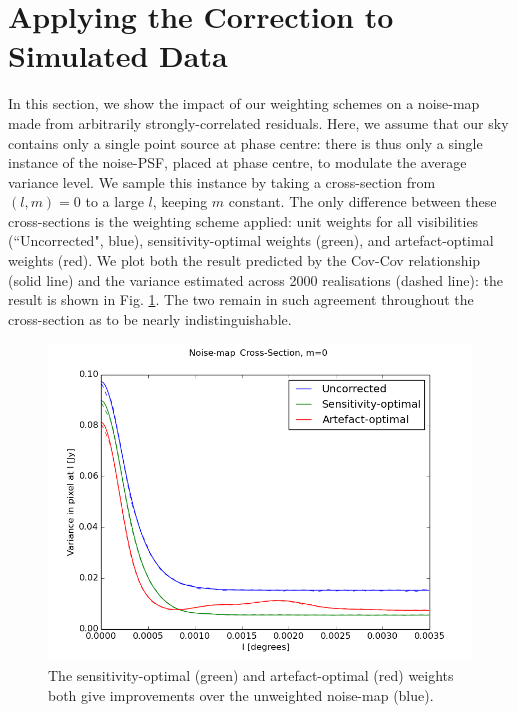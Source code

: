 \section{Applying the Correction to Simulated Data}\label{section.simulations.application}


\pg
In this section, we show the impact of our weighting schemes on a noise-map made from arbitrarily strongly-correlated residuals. Here, we assume that our sky contains only a single point source at phase centre: there is thus only a single instance of the noise-PSF, placed at phase centre, to modulate the average variance level. We sample this instance by taking a cross-section from $\left(l,m\right)=0$ to a large $l$, keeping $m$ constant. The only difference between these cross-sections is the weighting scheme applied: unit weights for all visibilities (``Uncorrected", blue), sensitivity-optimal weights (green), and artefact-optimal weights (red). We plot both the result predicted by the Cov-Cov relationship (solid line) and the variance estimated across 2000 realisations (dashed line): the result is shown in Fig. \ref{fig.simu.weightapplied}. The two remain in such agreement throughout the cross-section as to be nearly indistinguishable. 



\begin{figure}[h!]
    \centering
        \centering
        \includegraphics[width=\linewidth]{images/ctime001-NoisePsfCrossections-backup.png} 
        \caption{The sensitivity-optimal (green) and artefact-optimal (red) weights both give improvements over the unweighted noise-map (blue).} \label{fig.simu.weightapplied}
\end{figure}

